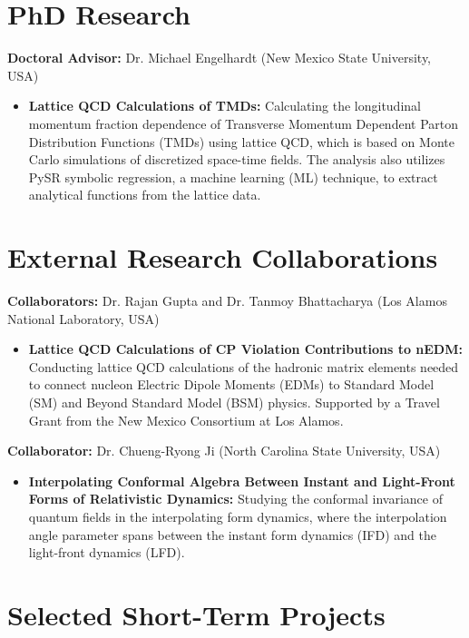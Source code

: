 \documentclass[11pt]{article}
\begin{document}
\section*{PhD Research}
\vspace{-0.3em}
\textbf{Doctoral Advisor:} Dr. Michael Engelhardt (New Mexico State University, USA)
\begin{itemize}
    \item \textbf{Lattice QCD Calculations of TMDs:} Calculating the longitudinal momentum fraction dependence of Transverse Momentum Dependent Parton Distribution Functions (TMDs) using lattice QCD, which is based on Monte Carlo simulations of discretized space-time fields. The analysis also utilizes PySR symbolic regression, a machine learning (ML) technique, to extract analytical functions from the lattice data.
\end{itemize}

\section*{External Research Collaborations}
\vspace{-0.3em}
\textbf{Collaborators:} Dr. Rajan Gupta and Dr. Tanmoy Bhattacharya (Los Alamos National Laboratory, USA)
\begin{itemize}
    \item \textbf{Lattice QCD Calculations of CP Violation Contributions to nEDM:} Conducting lattice QCD calculations of the hadronic matrix elements needed to connect nucleon Electric Dipole Moments (EDMs) to Standard Model (SM) and Beyond Standard Model (BSM) physics. Supported by a Travel Grant from the New Mexico Consortium at Los Alamos.
\end{itemize}

\textbf{Collaborator:} Dr. Chueng-Ryong Ji (North Carolina State University, USA)
\begin{itemize}
    \item \textbf{Interpolating Conformal Algebra Between Instant and Light-Front Forms of Relativistic Dynamics:} Studying the conformal invariance of quantum fields in the interpolating form dynamics, where the interpolation angle parameter spans between the instant form dynamics (IFD) and the light-front dynamics (LFD).
\end{itemize}

\section*{Selected Short-Term Projects}
\vspace{-0.3em}
\end{document}

